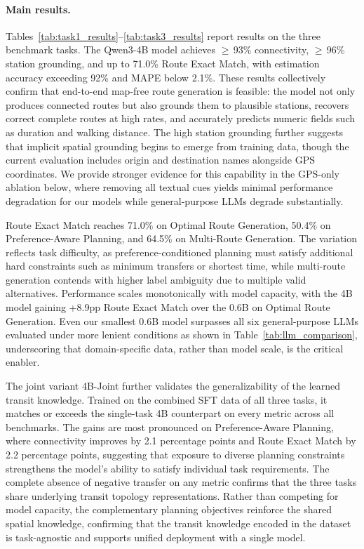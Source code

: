\documentclass{article}
\begin{document}
\paragraph{Main results.}
Tables~\ref{tab:task1_results}--\ref{tab:task3_results} report results on the three benchmark tasks. The Qwen3-4B model achieves $\geq$\,93\% connectivity, $\geq$\,96\% station grounding, and up to 71.0\% Route Exact Match, with estimation accuracy exceeding 92\% and MAPE below 2.1\%. These results collectively confirm that end-to-end map-free route generation is feasible: the model not only produces connected routes but also grounds them to plausible stations, recovers correct complete routes at high rates, and accurately predicts numeric fields such as duration and walking distance. The high station grounding further suggests that implicit spatial grounding begins to emerge from training data, though the current evaluation includes origin and destination names alongside GPS coordinates. We provide stronger evidence for this capability in the GPS-only ablation below, where removing all textual cues yields minimal performance degradation for our models while general-purpose LLMs degrade substantially.

Route Exact Match reaches 71.0\% on Optimal Route Generation, 50.4\% on Preference-Aware Planning, and 64.5\% on Multi-Route Generation. The variation reflects task difficulty, as preference-conditioned planning must satisfy additional hard constraints such as minimum transfers or shortest time, while multi-route generation contends with higher label ambiguity due to multiple valid alternatives. Performance scales monotonically with model capacity, with the 4B model gaining +8.9pp Route Exact Match over the 0.6B on Optimal Route Generation. Even our smallest 0.6B model surpasses all six general-purpose LLMs evaluated under more lenient conditions as shown in Table~\ref{tab:llm_comparison}, underscoring that domain-specific data, rather than model scale, is the critical enabler.

The joint variant 4B-Joint further validates the generalizability of the learned transit knowledge. Trained on the combined SFT data of all three tasks, it matches or exceeds the single-task 4B counterpart on every metric across all benchmarks. The gains are most pronounced on Preference-Aware Planning, where connectivity improves by 2.1 percentage points and Route Exact Match by 2.2 percentage points, suggesting that exposure to diverse planning constraints strengthens the model's ability to satisfy individual task requirements. The complete absence of negative transfer on any metric confirms that the three tasks share underlying transit topology representations. Rather than competing for model capacity, the complementary planning objectives reinforce the shared spatial knowledge, confirming that the transit knowledge encoded in the dataset is task-agnostic and supports unified deployment with a single model.
\end{document}
